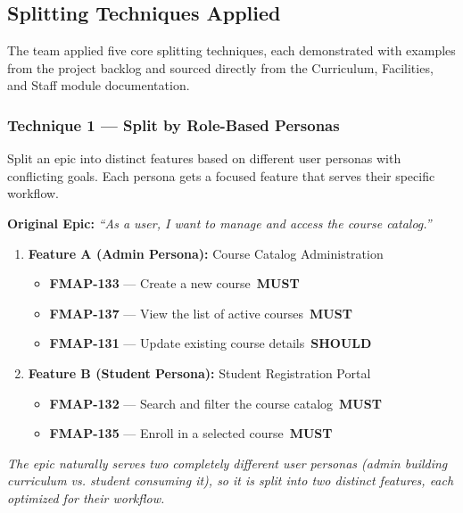 \documentclass[12pt, a4paper]{article}
\newcommand{\mustbadge}{\colorbox{mustcolor}{\color{white}\tiny\bfseries\,MUST\,}}
\newcommand{\shouldbadge}{\colorbox{shouldcolor}{\color{white}\tiny\bfseries\,SHOULD\,}}
\begin{document}
\subsection{Splitting Techniques Applied}

The team applied five core splitting techniques, each demonstrated with examples from the project backlog and sourced directly from the Curriculum, Facilities, and Staff module documentation.

\subsubsection{Technique 1 --- Split by Role-Based Personas}

Split an epic into distinct features based on different user personas with conflicting goals. Each persona gets a focused feature that serves their specific workflow.

\vspace{6pt}
\begin{tcolorbox}[storybox,title={\textbf{Example: Course Catalog Management (Curriculum Module)}},fonttitle=\bfseries\color{agileblue}]
\textbf{Original Epic:} \textit{``As a user, I want to manage and access the course catalog.''}
\vspace{4pt}
\begin{enumerate}[itemsep=2pt]
\item \textbf{Feature A (Admin Persona):} Course Catalog Administration
  \begin{itemize}[itemsep=1pt]
    \item \textbf{FMAP-133} --- Create a new course \mustbadge
    \item \textbf{FMAP-137} --- View the list of active courses \mustbadge
    \item \textbf{FMAP-131} --- Update existing course details \shouldbadge
  \end{itemize}
\item \textbf{Feature B (Student Persona):} Student Registration Portal
  \begin{itemize}[itemsep=1pt]
    \item \textbf{FMAP-132} --- Search and filter the course catalog \mustbadge
    \item \textbf{FMAP-135} --- Enroll in a selected course \mustbadge
  \end{itemize}
\end{enumerate}
\textit{The epic naturally serves two completely different user personas (admin building curriculum vs. student consuming it), so it is split into two distinct features, each optimized for their workflow.}
\end{tcolorbox}
\end{document}
